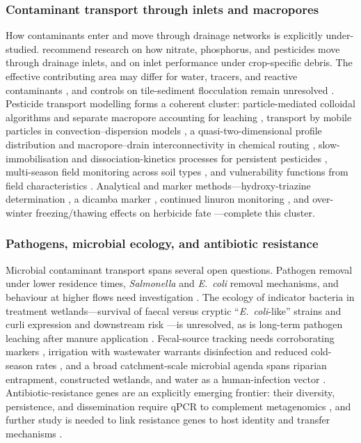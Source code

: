 \documentclass[11pt]{article}
\begin{document}
\subsubsection{Contaminant transport through inlets and macropores}

How contaminants enter and move through drainage networks is explicitly
under-studied. \textcite{Li2017b} recommend research on how nitrate, phosphorus,
and pesticides move through drainage inlets, and on inlet performance under
crop-specific debris. The effective contributing area may differ for water,
tracers, and reactive contaminants \parencite{Akay2008}, and controls on
tile-sediment flocculation remain unresolved \parencite{Stone1997}. Pesticide
transport modelling forms a coherent cluster: particle-mediated colloidal
algorithms and separate macropore accounting for leaching \parencite{Wendell2024},
transport by mobile particles in convection--dispersion models \parencite{Zehe2001},
a quasi-two-dimensional profile distribution and macropore--drain interconnectivity
in chemical routing \parencite{Fox2007b}, slow-immobilisation and
dissociation-kinetics processes for persistent pesticides \parencite{Novak2003},
multi-season field monitoring across soil types \parencite{Dousset2004}, and
vulnerability functions from field characteristics \parencite{Leu2004}. Analytical
and marker methods---hydroxy-triazine determination \parencite{MUIR1978}, a dicamba
marker \parencite{Heaven2012}, continued linuron monitoring \parencite{Gordon2005},
and over-winter freezing/thawing effects on herbicide fate \parencite{Siimes2006}
---complete this cluster.

\subsubsection{Pathogens, microbial ecology, and antibiotic resistance}

Microbial contaminant transport spans several open questions. Pathogen removal
under lower residence times, \textit{Salmonella} and \textit{E.\ coli} removal
mechanisms, and behaviour at higher flows need investigation
\parencite{Soupir2018}. The ecology of indicator bacteria in treatment
wetlands---survival of faecal versus cryptic ``\textit{E.\ coli}-like'' strains
\parencite{Stott2023} and curli expression and downstream risk
\parencite{Truhlar2015}---is unresolved, as is long-term pathogen leaching after
manure application \parencite{Malik2004}. Fecal-source tracking needs
corroborating markers \parencite{Gottschall2013}, irrigation with wastewater
warrants disinfection and reduced cold-season rates \parencite{Ding2021}, and a
broad catchment-scale microbial agenda spans riparian entrapment, constructed
wetlands, and water as a human-infection vector \parencite{Collins2007}.
Antibiotic-resistance genes are an explicitly emerging frontier: their diversity,
persistence, and dissemination require qPCR to complement metagenomics
\parencite{Smith2019b}, and further study is needed to link resistance genes to
host identity and transfer mechanisms \parencite{Rieke2018}.
\end{document}
